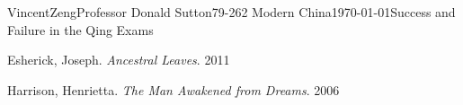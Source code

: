 \documentclass[12pt]{article}
\begin{document}
\begin{mla}{Vincent}{Zeng}{Professor Donald Sutton}{79-262 Modern China}{\today}{Success and Failure in the Qing Exams}
\begin{workscited}
	\bibent
	Esherick, Joseph. \textit{Ancestral Leaves}. 2011

	\bibent
	Harrison, Henrietta. \textit{The Man Awakened from Dreams}. 2006
\end{workscited}
\end{mla}
\end{document}
